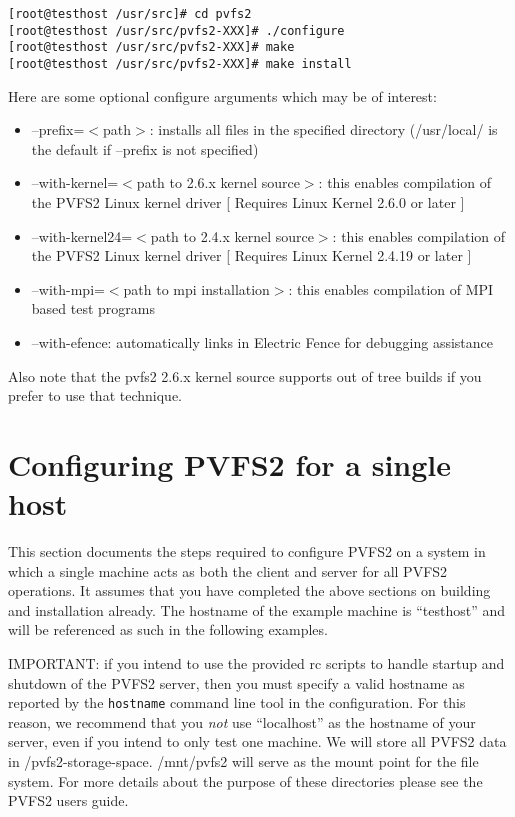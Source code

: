 \documentclass[11pt, letterpaper]{article}
\begin{document}
\begin{verbatim}
[root@testhost /usr/src]# cd pvfs2
[root@testhost /usr/src/pvfs2-XXX]# ./configure
[root@testhost /usr/src/pvfs2-XXX]# make
[root@testhost /usr/src/pvfs2-XXX]# make install
\end{verbatim}

Here are some optional configure arguments which may be of interest:
\begin{itemize}
\item --prefix=$<$path$>$: installs all files in the specified
directory (/usr/local/ is the default if --prefix is not specified)
\item --with-kernel=$<$path to 2.6.x kernel source$>$: this enables
compilation of the PVFS2 Linux kernel driver [ Requires Linux Kernel
2.6.0 or later ]
\item --with-kernel24=$<$path to 2.4.x kernel source$>$: this enables
compilation of the PVFS2 Linux kernel driver [ Requires Linux Kernel
2.4.19 or later ]
\item --with-mpi=$<$path to mpi installation$>$: this enables
compilation of MPI based test programs
\item --with-efence: automatically links in Electric Fence for
debugging assistance
\end{itemize}

Also note that the pvfs2 2.6.x kernel source supports out of tree
builds if you prefer to use that technique.

\section{Configuring PVFS2 for a single host}
\label{sec:single}

This section documents the steps required to configure PVFS2 on a system
in which a single machine acts as both the client and server for all
PVFS2 operations.  It assumes that you have completed the above sections
on building and installation already.  The hostname of the example machine
is ``testhost'' and will be referenced as such in the following examples.

IMPORTANT: if you intend to use the provided rc scripts to handle startup
and shutdown of the PVFS2 server, then you must specify a valid hostname 
as reported by the \texttt{hostname} command line tool in the configuration.
For this reason, we recommend that you \emph{not} use ``localhost'' as 
the hostname of your server, even if you intend to only test one machine.
We will store all PVFS2 data in /pvfs2-storage-space.  /mnt/pvfs2 will
serve as the mount point for the file system.  For more details about
the purpose of these directories please see the PVFS2 users guide.
\end{document}
